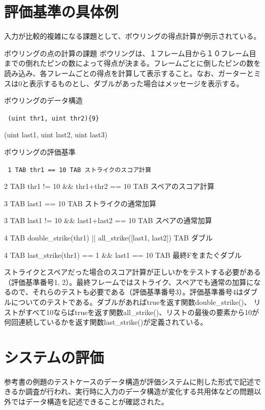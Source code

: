 \documentclass{tpu-sotu}
\begin{document}
\section{評価基準の具体例}
入力が比較的複雑になる課題として、ボウリングの得点計算が例示されている。
\begin{itembox}[l]{ボウリングの点の計算の課題}
ボウリングは、１フレーム目から１０フレーム目までの倒れたピンの数によって得点が決まる。フレームごとに倒したピンの数を読み込み、各フレームごとの得点を計算して表示すること。なお、ガーターとミスは0と表示するものとし、ダブルがあった場合はメッセージを表示する。
\end{itembox}
\begin{minipage}[b]{.7\textwidth}
\begin{itembox}[l]{ボウリングのデータ構造}
{\tt
(uint thr1, uint thr2)\{9\}

(uint last1, uint last2, uint last3)
}
\end{itembox}
\end{minipage}
\begin{itembox}[l]{ボウリングの評価基準}
{\tt
1 TAB thr1 == 10 TAB ストライクのスコア計算

2 TAB thr1 != 10 \&\& thr1+thr2 == 10 TAB スペアのスコア計算

3 TAB last1 == 10 TAB ストライクの通常加算

3 TAB last1 != 10  \&\& last1+last2 == 10 TAB スペアの通常加算

4 TAB double\_strike(thr1) || all\_strike([last1, last2]) TAB ダブル

4 TAB last\_strike(thr1) == 1 \&\& last1 == 10 TAB 最終Fをまたぐダブル
}
\end{itembox}

ストライクとスペアだった場合のスコア計算が正しいかをテストする必要がある（評価基準番号1, 2）。最終フレームではストライク、スペアでも通常の加算になるので、それらのテストも必要である（評価基準番号3）。評価基準番号4はダブルについてのテストである。ダブルがあればtrueを返す関数double\_strike()、 リストがすべて10ならばtrueを返す関数all\_strike()、リストの最後の要素から10が何回連続しているかを返す関数last\_strike()が定義されている。
\section{システムの評価}
参考書の例題のテストケースのデータ構造が評価システムに則した形式で記述できるか調査が行われ、実行時に入力のデータ構造が変化する共用体などの問題以外ではデータ構造を記述できることが確認された。
\end{document}
